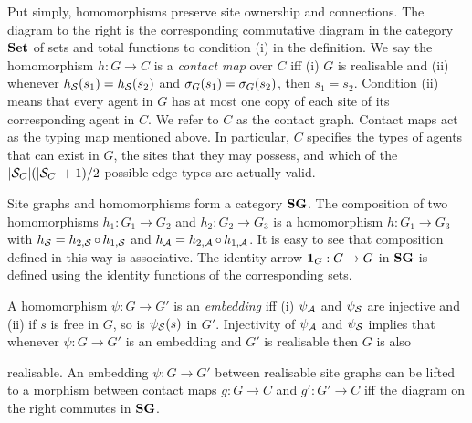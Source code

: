 Put simply, homomorphisms preserve site ownership and connections.
The diagram to the right is the corresponding
commutative diagram in the category $\mathbf{Set}$
of sets and total functions
to condition (i) in the definition.
We say the homomorphism $h: G \to C$ is
a \emph{contact map} over $C$ iff
(i) $G$ is realisable and
(ii) whenever $h_{\mathcal{S}}(s_1) = h_{\mathcal{S}}(s_2)$
and $\sigma_G(s_1) = \sigma_G(s_2)$, then $s_1 = s_2$.
Condition (ii) means that every agent in $G$ has at most
one copy of each site of its corresponding agent in $C$.
We refer to $C$ as the contact graph.
Contact maps act as the typing map mentioned above.
In particular,
$C$ specifies the types of agents that can exist in $G$,
the sites that they may possess,
and which of the $|\mathcal{S}_C|(|\mathcal{S}_C|+1)/2$
possible edge types are actually valid.

Site graphs and homomorphisms form a category $\mathbf{SG}$.
The composition of two homomorphisms
$h_1: G_1 \to G_2$ and $h_2: G_2 \to G_3$
is a homomorphism $h: G_1 \to G_3$ with
$h_{\mathcal{S}} = h_{2,\mathcal{S}} \operatorname*{\circ} h_{1,\mathcal{S}}$ and
$h_{\mathcal{A}} = h_{2,\mathcal{A}} \operatorname*{\circ} h_{1,\mathcal{A}}$.
It is easy to see that composition defined in this way is associative.
The identity arrow $\boldsymbol{\mathbf{1}}_G: G \to G$ in $\mathbf{SG}$ is defined
using the identity functions of the corresponding sets.

A homomorphism $\psi: G \to G'$ is an \emph{embedding} iff
(i) $\psi_{\mathcal{A}}$ and $\psi_{\mathcal{S}}$ are injective and
(ii) if $s$ is free in $G$, so is $\psi_{\mathcal{S}}(s)$ in $G'$.
Injectivity of $\psi_{\mathcal{A}}$ and $\psi_{\mathcal{S}}$ implies that
whenever $\psi: G \to G'$ is an embedding and $G'$ is realisable
then $G$ is also
\begin{wrapfigure}[3]{r}{0.28\textwidth}
  \vspace{-1.5em}
  \begin{center}
  \end{center}
\end{wrapfigure}
realisable.
An embedding $\psi: G \to G'$ between realisable site graphs
can be lifted to a morphism between contact maps $g: G \to C$
and $g': G' \to C$ iff the diagram on the right commutes in $\mathbf{SG}$.

